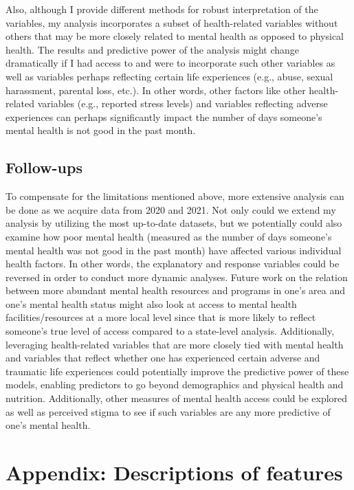 \documentclass[
]{article}
\begin{document}
Also, although I provide different methods for robust interpretation of the variables, my analysis incorporates a subset of health-related variables without others that may be more closely related to mental health as opposed to physical health. The results and predictive power of the analysis might change dramatically if I had access to and were to incorporate such other variables as well as variables perhaps reflecting certain life experiences (e.g., abuse, sexual harassment, parental loss, etc.). In other words, other factors like other health-related variables (e.g., reported stress levels) and variables reflecting adverse experiences can perhaps significantly impact the number of days someone's mental health is not good in the past month.

\hypertarget{follow-ups}{%
\subsection{Follow-ups}\label{follow-ups}}

To compensate for the limitations mentioned above, more extensive analysis can be done as we acquire data from 2020 and 2021. Not only could we extend my analysis by utilizing the most up-to-date datasets, but we potentially could also examine how poor mental health (measured as the number of days someone's mental health was not good in the past month) have affected various individual health factors. In other words, the explanatory and response variables could be reversed in order to conduct more dynamic analyses. Future work on the relation between more abundant mental health resources and programs in one's area and one's mental health status might also look at access to mental health facilities/resources at a more local level since that is more likely to reflect someone's true level of access compared to a state-level analysis. Additionally, leveraging health-related variables that are more closely tied with mental health and variables that reflect whether one has experienced certain adverse and traumatic life experiences could potentially improve the predictive power of these models, enabling predictors to go beyond demographics and physical health and nutrition. Additionally, other measures of mental health access could be explored as well as perceived stigma to see if such variables are any more predictive of one's mental health.

\appendix

\hypertarget{appendix}{%
\section{Appendix: Descriptions of features}\label{appendix}}
\end{document}
